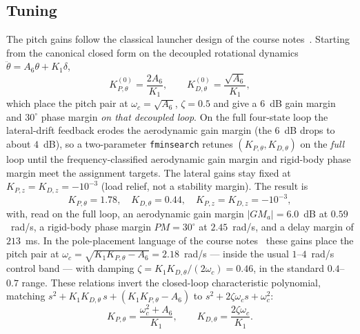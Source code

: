 \documentclass[../main.tex]{subfiles}
\begin{document}
\subsection{Tuning}

The pitch gains follow the classical launcher design of the course
notes~\cite[Lecture~16]{dclvnotes}. Starting from the canonical closed form on
the decoupled rotational dynamics $\ddot\theta = A_6\theta + K_1\delta$,
\begin{equation}
K_{P,\theta}^{(0)} = \frac{2A_6}{K_1}, \qquad
K_{D,\theta}^{(0)} = \frac{\sqrt{A_6}}{K_1},
\label{eq:canon}
\end{equation}
which place the pitch pair at $\omega_c=\sqrt{A_6}$, $\zeta=0.5$ and give a
$6$~dB gain margin and $30^\circ$ phase margin \emph{on that decoupled loop}.
On the full four-state loop the lateral-drift feedback erodes the aerodynamic
gain margin (the $6$~dB drops to about $4$~dB), so a two-parameter
\texttt{fminsearch} retunes $(K_{P,\theta},K_{D,\theta})$ on the \emph{full}
loop until the frequency-classified aerodynamic gain margin and rigid-body phase
margin meet the assignment targets. The lateral gains stay fixed at
$K_{P,z}=K_{D,z}=-10^{-3}$ (load relief, not a stability margin). The result is
\begin{equation}
K_{P,\theta} = 1.78,\quad K_{D,\theta} = 0.44,\quad
K_{P,z}=K_{D,z}=-10^{-3},
\end{equation}
with, read on the full loop, an aerodynamic gain margin $|GM_a| = 6.0$~dB at
$0.59$~rad/s, a rigid-body phase margin $PM = 30^\circ$ at $2.45$~rad/s, and a
delay margin of $213$~ms.
In the pole-placement language of the course notes~\cite[Lecture~15]{dclvnotes}
these gains place the pitch pair at $\omega_c = \sqrt{K_1 K_{P,\theta}-A_6} =
2.18$~rad/s --- inside the usual $1$--$4$~rad/s control band --- with damping
$\zeta = K_1 K_{D,\theta}/(2\omega_c) = 0.46$, in the standard $0.4$--$0.7$
range. These relations invert the closed-loop characteristic polynomial, matching
$s^2 + K_1 K_{D,\theta}\,s + (K_1 K_{P,\theta} - A_6)$ to $s^2 + 2\zeta\omega_c s + \omega_c^2$:
\begin{equation}
K_{P,\theta} = \frac{\omega_c^2 + A_6}{K_1}, \qquad
K_{D,\theta} = \frac{2\zeta\omega_c}{K_1}.
\label{eq:poleplace}
\end{equation}
\end{document}
